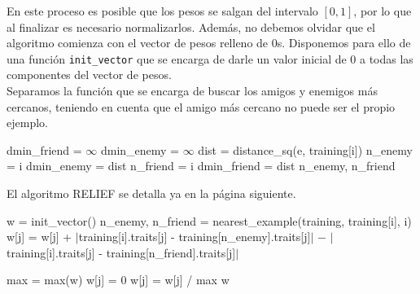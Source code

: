 \documentclass[12pt]{article}
\begin{document}
En este proceso es posible que los pesos se salgan del intervalo $[0,1]$, por lo que al finalizar es necesario normalizarlos. Además, no debemos olvidar que el algoritmo comienza con el vector de pesos relleno de $0$s. Disponemos para ello de una función \verb|init_vector| que se encarga de darle un valor inicial de $0$ a todas las componentes del vector de pesos.\\

Separamos la función que se encarga de buscar los amigos y enemigos más cercanos, teniendo en cuenta que el amigo más cercano no puede ser el propio ejemplo.

\begin{algorithm}[h]
\begin{algorithmic}

     \State dmin\_friend = $\infty$
     \State dmin\_enemy = $\infty$
       
            \State dist = distance\_sq(e, training[i])
                  \State n\_enemy = i
                  \State dmin\_enemy = dist
                  \State n\_friend = i
                  \State dmin\_friend = dist
            \EndIf
          \EndIf
       \EndFor
   \State \Return n\_enemy, n\_friend
\EndFunction

\end{algorithmic}
\end{algorithm}

El algoritmo RELIEF se detalla ya en la página siguiente.
\newpage

\begin{algorithm}[h!]
\begin{algorithmic}

     \State w = init\_vector()
       
         \State n\_enemy, n\_friend = nearest\_example(training, training[i], i)
           
            \State w[j] = w[j] + $|$training[i].traits[j] - training[n\_enemy].traits[j]$|$
            \State \hspace{2.5em} $-$ $|$training[i].traits[j] - training[n\_friend].traits[j]$|$
          
         \EndFor
      \EndFor
      \State max = max(w)
        
            \State w[j] = 0
        \Else
            \State w[j] = w[j] / max
        \EndIf
      \EndFor
\State \Return w
\EndFunction

\end{algorithmic}
\end{algorithm}
\end{document}
